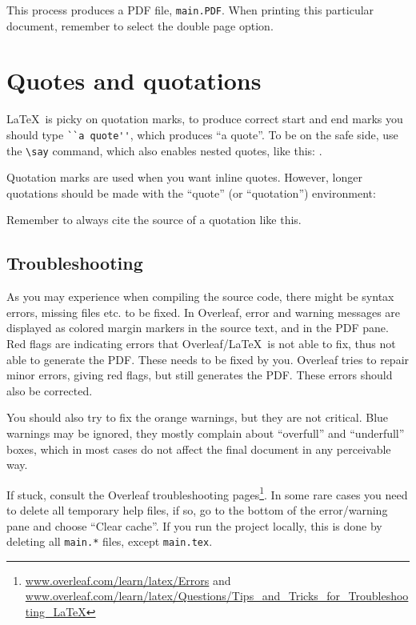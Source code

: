 This process produces a PDF file,
\texttt{main.PDF}. When printing this particular document, remember to select the double page option.

\section{Quotes and quotations}

\LaTeX\ is picky on quotation marks, to produce correct start and end marks you should type \verb|``a quote''|, which produces ``a quote''. To be on the safe side, use the \verb|\say| command, which also enables nested quotes, like this: .

Quotation marks are used when you want inline quotes. However, longer quotations should be made with the ``quote'' (or ``quotation'') environment:
\begin{quote} 
    \lipsum[3-4]
\end{quote}

Remember to always cite the source of a quotation like this.

\subsection{Troubleshooting}

As you may experience when compiling the source code, there might be syntax errors, missing files etc. to be fixed. In Overleaf, error and warning messages are displayed as colored margin markers in the source text, and in the PDF pane. Red flags are indicating errors that Overleaf/\LaTeX\ is not able to fix, thus not able to generate the PDF. These needs to be fixed by you. Overleaf tries to repair minor errors, giving red flags, but still generates the PDF. These errors should also be corrected.

You should also try to fix the orange warnings, but they are not critical. Blue warnings may be ignored, they mostly complain about ``overfull'' and ``underfull'' boxes, which in most cases do not affect the final document in any perceivable way.

If stuck, consult the Overleaf troubleshooting pages\footnote{\url{www.overleaf.com/learn/latex/Errors} and
\url{www.overleaf.com/learn/latex/Questions/Tips_and_Tricks_for_Troubleshooting_LaTeX}}. In some rare cases you need to delete all temporary help files, if so, go to the bottom of the error/warning pane and choose ``Clear cache''. If you run the project locally, this is done by deleting all \texttt{main.*} files, except \texttt{main.tex}.

